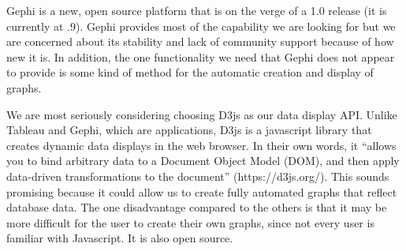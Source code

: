 \documentclass[letterpaper,10pt,titlepage]{article}
\begin{document}
Gephi is a new, open source platform that is on the verge of a 1.0 release (it is currently at .9). Gephi provides most of the capability we are looking for but we are concerned about its stability and lack of community support because of how new it is. In addition, the one functionality we need that Gephi does not appear to provide is some kind of method for the automatic creation and display of graphs. 

We are most seriously considering choosing D3js as our data display API. Unlike Tableau and Gephi, which are applications, D3js is a javascript library that creates dynamic data displays in the web browser. In their own words, it “allows you to bind arbitrary data to a Document Object Model (DOM), and then apply data-driven transformations to the document” (https://d3js.org/). This sounds promising because it could allow us to create fully automated graphs that reflect database data. The one disadvantage compared to the others is that it may be more difficult for the user to create their own graphs, since not every user is familiar with Javascript. It is also open source. 
\end{document}
